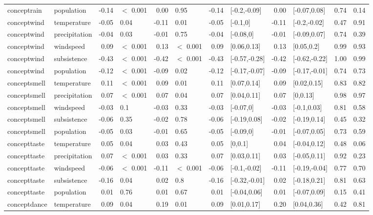 \begin{table}[ht]
\begin{tabular}{llrlrlrlrlrr}
  conceptrain & population & -0.14 & $<$ 0.001 & 0.00 & 0.95 & -0.14 & [-0.2,-0.09] & 0.00 & [-0.07,0.08] & 0.74 & 0.14 \\ 
  conceptwind & temperature & -0.05 & 0.04 & -0.11 & 0.01 & -0.05 & [-0.1,0] & -0.11 & [-0.2,-0.02] & 0.47 & 0.91 \\ 
  conceptwind & precipitation & -0.04 & 0.03 & -0.01 & 0.75 & -0.04 & [-0.08,0] & -0.01 & [-0.09,0.07] & 0.74 & 0.39 \\ 
  conceptwind & windspeed & 0.09 & $<$ 0.001 & 0.13 & $<$ 0.001 & 0.09 & [0.06,0.13] & 0.13 & [0.05,0.2] & 0.99 & 0.93 \\ 
  conceptwind & subsistence & -0.43 & $<$ 0.001 & -0.42 & $<$ 0.001 & -0.43 & [-0.57,-0.28] & -0.42 & [-0.62,-0.22] & 1.00 & 0.99 \\ 
  conceptwind & population & -0.12 & $<$ 0.001 & -0.09 & 0.02 & -0.12 & [-0.17,-0.07] & -0.09 & [-0.17,-0.01] & 0.74 & 0.73 \\ 
  conceptsmell & temperature & 0.11 & $<$ 0.001 & 0.09 & 0.01 & 0.11 & [0.07,0.14] & 0.09 & [0.02,0.15] & 0.83 & 0.82 \\ 
  conceptsmell & precipitation & 0.07 & $<$ 0.001 & 0.07 & 0.04 & 0.07 & [0.04,0.11] & 0.07 & [0,0.13] & 0.98 & 0.97 \\ 
  conceptsmell & windspeed & -0.03 & 0.1 & -0.03 & 0.33 & -0.03 & [-0.07,0] & -0.03 & [-0.1,0.03] & 0.81 & 0.58 \\ 
  conceptsmell & subsistence & -0.06 & 0.35 & -0.02 & 0.78 & -0.06 & [-0.19,0.08] & -0.02 & [-0.19,0.14] & 0.45 & 0.32 \\ 
  conceptsmell & population & -0.05 & 0.03 & -0.01 & 0.65 & -0.05 & [-0.09,0] & -0.01 & [-0.07,0.05] & 0.73 & 0.59 \\ 
  concepttaste & temperature & 0.05 & 0.04 & 0.03 & 0.43 & 0.05 & [0,0.1] & 0.04 & [-0.04,0.12] & 0.48 & 0.06 \\ 
  concepttaste & precipitation & 0.07 & $<$ 0.001 & 0.03 & 0.33 & 0.07 & [0.03,0.11] & 0.03 & [-0.05,0.11] & 0.92 & 0.23 \\ 
  concepttaste & windspeed & -0.06 & $<$ 0.001 & -0.11 & $<$ 0.001 & -0.06 & [-0.1,-0.02] & -0.11 & [-0.19,-0.04] & 0.77 & 0.70 \\ 
  concepttaste & subsistence & -0.16 & 0.04 & 0.02 & 0.8 & -0.16 & [-0.32,-0.01] & 0.02 & [-0.18,0.21] & 0.81 & 0.63 \\ 
  concepttaste & population & 0.01 & 0.76 & 0.01 & 0.67 & 0.01 & [-0.04,0.06] & 0.01 & [-0.07,0.09] & 0.15 & 0.41 \\ 
  conceptdance & temperature & 0.09 & 0.04 & 0.19 & 0.01 & 0.09 & [0.01,0.17] & 0.20 & [0.04,0.36] & 0.42 & 0.81 \\ 

\end{tabular}
\end{table}
